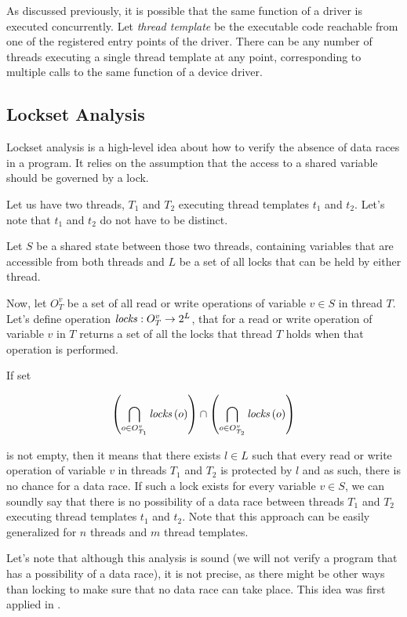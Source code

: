 \documentclass[..thesis.tex]{subfiles}
\begin{document}
As discussed previously, it is possible that the same function of a driver is executed concurrently.
Let \textit{thread template} be the executable code reachable from one of the registered entry points of the driver.
There can be any number of threads executing a single thread template at any point, corresponding to multiple calls to the same function of a device driver.

\subsection{Lockset Analysis}

Lockset analysis is a high-level idea about how to verify the absence of data races in a program.
It relies on the assumption that the access to a shared variable should be governed by a lock.

Let us have two threads, $T_1$ and $T_2$ executing thread templates $t_1$ and $t_2$. Let's note that $t_1$ and $t_2$ do not have to be distinct.

Let $S$ be a shared state between those two threads,
containing variables that are accessible from both threads and $L$ be a set of all locks that can be held by either thread.

Now, let $O_{T}^v$ be a set of all read or write operations of variable $v \in S$ in thread $T$.
Let's define operation $\mathit{locks} : O_{T}^v \to 2^L$, that for a read or write operation of variable $v$ in $T$ returns a set of all the locks that thread $T$
holds when that operation is performed.

If set

\begin{equation*}
\left( \bigcap \limits_{o \in O_{T_1}^v} \mathit{locks} \left(o \right) \right) \cap  \left( \bigcap \limits_{o \in O_{T_2}^v} \mathit{locks} \left(o \right) \right)
\end{equation*}

is not empty, then it means that there exists $l \in L$ such that every read or write operation of variable $v$ in threads $T_1$ and $T_2$ is protected by $l$ and as such,
there is no chance for a data race. If such a lock exists for every variable $v \in S$, we can soundly say that there is no possibility of a data race between threads $T_1$ and
$T_2$ executing thread templates $t_1$ and $t_2$. Note that this approach can be easily generalized for $n$ threads and $m$ thread templates.

Let's note that although this analysis is sound (we will not verify a program that has a possibility of a data race),
it is not precise, as there might be other ways than locking to make sure that no data race can take place. This idea was first applied in \cite{engler_racerx:_2003}.
\end{document}
